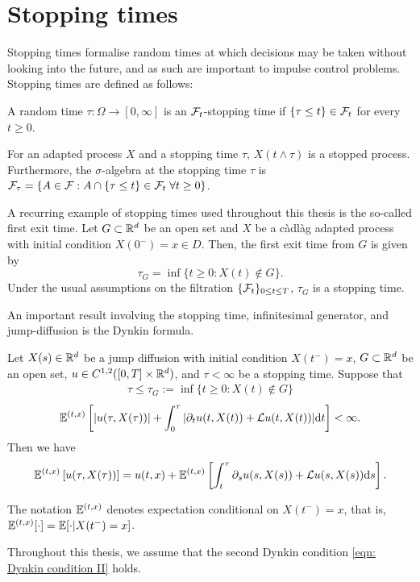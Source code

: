 \section{Stopping times}
\label{section: Stopping times}
Stopping times formalise random times at which decisions may be taken without looking into the future, and as such are important to impulse control problems. Stopping times are defined as follows:
\begin{definition}
    A random time $\tau: \Omega \rightarrow [0,\infty]$ is an $\mathcal{F}_t$-stopping time if $\{\tau \leq t\} \in \mathcal{F}_t$ for every $t \geq 0$. 
\end{definition}
For an adapted process $X$ and a stopping time $\tau$, $X(t \wedge \tau)$ is a stopped process. Furthermore, the $\sigma$-algebra at the stopping time $\tau$ is $\mathcal{F}_\tau = \{A \in \mathcal{F}: A \cap \{\tau \leq t\} \in \mathcal{F}_t \; \forall t \geq 0\}$. 
\begin{example}
    A recurring example of stopping times used throughout this thesis is the so-called first exit time. Let $G \subset \mathbb{R}^d$ be an open set and $X$ be a càdlàg adapted process with initial condition $X(0^-)=x \in D$. Then, the first exit time from $G$ is given by 
    \begin{equation*}
        \tau_G = \inf\{t \geq 0: X(t) \notin G\}. 
    \end{equation*}
    Under the usual assumptions on the filtration $\{\mathcal{F}_t\}_{0 \leq t \leq T}$, $\tau_G$ is a stopping time. 
\end{example}

An important result involving the stopping time, infinitesimal generator, and jump-diffusion is the Dynkin formula. 
\begin{theorem}
\label{trm: Dynkin formula}
    Let $X(s) \in \mathbb{R}^d$ be a jump diffusion with initial condition $X(t^-)=x$, $G \subset \mathbb{R}^d$ be an open set, $u \in C^{1,2}([0,T] \times \mathbb{R}^d)$, and $\tau < \infty$ be a stopping time. Suppose that 
    \begin{align*}
        \tau \leq \tau_G := \inf \{t\geq 0: X(t) \notin G\}
    \end{align*}
    \begin{align}
        \mathbb{E}^{(t,x)} \left[ |u(\tau, X(\tau))| + \int_0^\tau |\partial_t u(t,X(t)) + \mathcal{L} u(t,X(t))| \mathrm{d} t\right] < \infty. 
        \label{eqn: Dynkin condition II}
    \end{align}
    Then we have
    \begin{equation*}
        \mathbb{E}^{(t,x)} \left[ u(\tau,X(\tau)) \right] = u(t,x) + \mathbb{E}^{(t,x)} \left[\int_t^\tau \partial_s u(s,X(s)) + \mathcal{L} u(s,X(s)) \mathrm{d} s \right].
    \end{equation*}
\end{theorem}
\begin{remark}
    The notation $\mathbb{E}^{(t,x)}$ denotes expectation conditional on $X(t^-)=x$, that is,  $\mathbb{E}^{(t,x)}[\cdot] = \mathbb{E}[\cdot | X(t^-) = x]$. 
\end{remark}
Throughout this thesis, we assume that the second Dynkin condition \eqref{eqn: Dynkin condition II} holds. 

